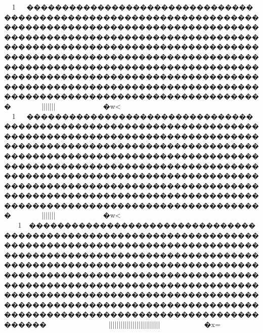 {{{{{{{{{{{{{{{{{{{{{{{{{{{{{{{{{{{{{{{{{{{{{{{{{{{{{{{{{{{{{{{{{{{{{{{{{{{{{{{{{{{{{{{{{{{{{{{{{{{{{{{{{{{{{{{{{{{{{{{{{{{{{{{{{{{{{{{{{{{{{{{{{{{{{{{{{{{{{{{{{{{{{{{{{{{{{{{{{{{{{{{{{{{{{{{{{{{{{{{{{{{{{{{{{{{{{{{{{{{{{{{{{{{{{{{{{{{{{{{{{{{{{{{{{{{{{{{{{{{{{{{{{{{{{{{{{{{{{{{{{{{{{{{{{{{{{{{{{{{{{{{{{{{{{{{{{{{{{{{{{{{{{{{{{{{{{{{{{{{{{{{{{{{{{{{{{{{{{{{{{{{{{{{{{{{{{{{{{{{{{{{{{{{{{{{{{{{{{{{{{{{{{{{{{{{{{{{{{{{{{{{{{{{{{{{{{{{{{{{{{{{{{{{{{{{{{{{{{{{{{{{{{{{{{{{{{{{{{{{{{{{{{{{{{{{{{{{{{{{{{{{{{{{{{{{{{{{{{{{{{{{{{{{{{{{{{{{{{{{{{{{{{{{{{{{{{{{{{{{{{{{{{{{{{{{{{{{{{{{{{{{{{{{{{{{{{{{{{{{{{{{{{{{{{{{{{{{{{{{{{{{{{{{{{{{{{{{{{{{{{{{{{{{{{{{{{{{{{{{{{{{{{{{{{{{{{{{{{{{{{{{{{{{{{{{{{{{{{{{{{{{{{{{{{{{{{{{{{{{{{{{{{{{{{{{{{{{{{{{{{{{{{{{{{{{{{{{{{{{{{{{{{{{{{{{{{{{{{{{{{{{{{{{{{{{{{{{{{{{{{{{{{{{{{{{{{{{{{{{{{{{{{{{{{{{{{{{{{{{{{{{{{{{{{{{{{{{{{{{{{{{{{{{{{{{{{1\lx{}~~���������������������������������������������������������������������������������������������������������������������������������������������������������������������������������������������������������������������������������������������������������������������������������������������������������������������������������������������������������������������~~~}}}}}}}}}}}}}|||{{{{{{{{{{{{{{{{{{{{{{{{{{{{{{{{{{{{}}}}}}}}}}}}||||}~~~~~~~~~�w<

1\lx{}~~���������������������������������������������������������������������������������������������������������������������������������������������������������������������������������������������������������������������������������������������������������������������������������������������������������������������������������������������������������������������~~~}}}}}}}}}}}}}|||{{{{{{{{{{{{{{{{{{{{{{{{{{{{{{{{{{{{}}}}}}}}}}}}||||}~~~~~~~~~�w<
1\lx{}~��������������������������������������������������������������������������������������������������������������������������������������������������������������������������������������������������������������������������������������������������������������������������������������������������������������������������������������������������������������������������~~~~~~~~~}~~~~~~~~}}}|||{{{{{{{{{{{{{{|||||||||||||||||||||||}}}}}}}}}}}}}}}}}~~~~~~~~�x=
}}}}}}}}}}}}}}}}}}}}}}}}}}}}}}}}}}}}}}}}}}}}}}}}}}}}}}}}}}}}}}}}}}}}}}}}}}}}}}}}}}}}}}}}}}}}}}}}}}}}}}}}}}}}}}}}}}}}}}}}}}}}}}}}}}}}}}}}}}}}}}}}}}}}}}}}}}}}}}}}}}}}}}}}}}}}}}}}}}}}}}}}}}}}}}}}}}}}}}}}}}}}}}}}}}}}}}}}}}}}}}}}}}}}}}}}}}}}}}}}}}}}}}}}}}}}}}}}}}}}}}}}}}}}}}}}}}}}}}}}}}}}}}}}}}}}}}}}}}}}}}}}}}}}}}}}}}}}}}}}}}}}}}}}}}}}}}}}}}}}}}}}}}}}}}}}}}}}}}}}}}}}}}}}}}}}}}}}}}}}}}}}}}}}}}}}}}}}}}}}}}}}}}}}}}}}}}}}}}}}}}}}}}}}}}}}}}}}}}}}}}}}}}}}}}}}}}}}}}}}}}}}}}}}}}}}}}}}}}}}}}}}}}}}}}}}}}}}}}}}}}}}}}}}}}}}}}}}}}}}}}}}}}}}}}}}}}}}}}}}}}}}}}}}}}}}}}}}}}}}}}}}}}}}}}}}}}}}}}}}}}}}}}}}}}}}}}}}}}}}}}}}}}}}}}}}}}}}}}}}}}}}}}}}}}}}}}}}}}}}}}}}}}}}}}}}}}}}}}}}}}}}}}}}}}}}}}}}}}}}}}}}}}}}}}}}}}}}}}}}}}}}}}}}}}}}}}}}}}}}}}}}}}}}}}}}}}}}}}}}}}}}}}}}}}}}}}}}}}}}}}}}}}}}}}}}}}}}}}}}}}}}}}}}}}}}}}}}}}}}}}}}}}}}}}}}}}}}}}}}}}}}}}}}}}}}}}}}}}}}}}}}}}}}}}}}}}}}}}}}}}}}}}}}}}}}}}}}}}}}}}}}}}
